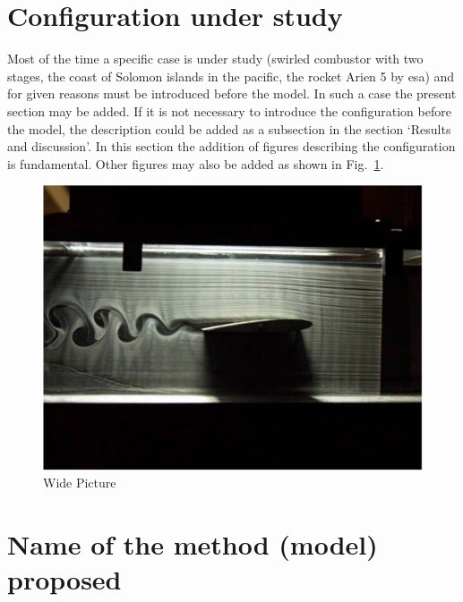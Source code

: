 \documentclass[fleqn,12pt]{NTFD} %
\begin{document}
\lipsum[1-3] %


\section{Configuration under study}


Most of the time a specific case is under study (swirled combustor with two stages, the coast of Solomon islands in the pacific, the rocket Arien 5 by esa) and for given reasons must  be introduced before the model. In such a case the present section may be added. If it is not necessary to introduce the configuration before the model, the description could be added as a subsection in the section `Results and discussion'. In this section  the addition of figures describing the configuration is fundamental. Other figures may also be added as shown in Fig.~\ref{fig:view}. 

\begin{figure}[ht]\centering %
\includegraphics[width=\linewidth]{./imagen1.pdf}
\caption{Wide Picture}
\label{fig:view}
\end{figure}



\section{Name of the method (model) proposed}
\end{document}
